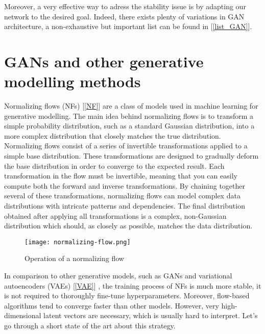 \documentclass [12pt] {article}
\numberwithin{equation}{section} %
\numberwithin{figure}{section}   %
\begin{document}
Moreover, a very effective way to adress the stability issue is by adapting our network to the desired goal. Indeed, there exists plenty of variations in GAN architecture, a non-exhaustive but important list can be found in [\ref{list_GAN}].

\newpage



\newpage



\newpage


\newpage

\section{GANs and other generative modelling methods}


Normalizing flows (NFs) [\ref{NF}] are a class of models used in machine learning for generative modelling. The main idea behind normalizing flows is to transform a simple probability distribution, such as a standard Gaussian distribution, into a more complex distribution that closely matches the true distribution.\\ 
Normalizing flows consist of a series of invertible transformations applied to a simple base distribution. These transformations are designed to gradually deform the base distribution in order to converge to the expected result. Each transformation in the flow must be invertible, meaning that you can easily compute both the forward and inverse transformations.  By chaining together several of these transformations, normalizing flows can model complex data distributions with intricate patterns and dependencies. The final distribution obtained after applying all transformations is a complex, non-Gaussian distribution which should, as closely as possible, matches the data distribution.\\

\begin{figure}[H]
    \centering
    \texttt{[image: normalizing-flow.png]}
    \caption{Operation of a normalizing flow}
    \label{Operation of a normalizing flow}
\end{figure}

In comparison to other generative models, such as GANs and variational autoencoders (VAEs) [\ref{VAE}] , the training process of NFs is much more stable, it is not required to thoroughly fine-tune hyperparameters. Moreover, flow-based algorithms tend to converge faster than other models. However, very high-dimensional latent vectors are necessary, which is usually hard to interpret. Let's go through a short state of the art about this strategy.
\end{document}
